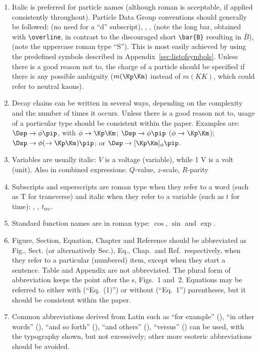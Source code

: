 \begin{enumerate}
\item Italic is preferred for particle names (although roman is
  acceptable, if applied consistently throughout).  Particle Data
  Group conventions should generally be followed: \Bd (no need for a
  ``d'' subscript), \decay{\Bs}{\jpsi\phi}, \Bsb,
  (note the long bar, obtained with \verb!\overline!, in contrast to the discouraged short \verb!\bar{B}! resulting in $\bar{B}$), \KS (note the
  uppercase roman type ``S''). 
This is most easily achieved by using the predefined symbols described in 
  Appendix~\ref{sec:listofsymbols}.
  Unless there is a good reason not to, the charge of a particle should be
  specified if there is any possible ambiguity 
  ($m(\Kp\Km)$ instead of $m(KK)$, which could refer to neutral kaons).

\item Decay chains can be written in several ways, depending on the complexity and the number of times it occurs. Unless there is a good reason not to, usage of a particular type should be consistent within the paper.
Examples are: 
$\Dsp\to\phi\pip$, with $\phi\to\Kp\Km$; 
$\Dsp\to\phi\pip$ ($\phi\to\Kp\Km$);  
$\Dsp\to\phi(\to\Kp\Km)\pip$; or
$\Dsp\to[\Kp\Km]_\phi\pip$.



\item Variables are usually italic: $V$ is a voltage (variable), while
  1 V is a volt (unit). Also in combined expressions: $Q$-value, $z$-scale, $R$-parity \etc

\item Subscripts and superscripts are roman type when they refer to a word (such as T
  for transverse) and italic when they refer to a variable (such as
  $t$ for time): \pt, \dms, $t_{\mathrm{rec}}$.

\item Standard function names are in roman type: \eg $\cos$, $\sin$
  and $\exp$.

\item Figure, Section, Equation, Chapter and Reference should be
  abbreviated as Fig., Sect. (or alternatively Sec.), Eq., Chap.\ and
  Ref.\ respectively, when they refer to a particular (numbered) item,
  except when they start a sentence. Table and Appendix are not
  abbreviated.  The plural form of abbreviation keeps the point after
  the s, \eg Figs.~1 and~2. Equations may be referred to either with 
  (``Eq.~(1)'') or without (``Eq.~1'') parentheses, 
  but it should be consistent within the paper.

\item Common abbreviations derived from Latin such as ``for example''
  (\eg), ``in other words'' (\ie), ``and so forth'' (\etc), ``and
  others'' (\etal), ``versus'' (\vs) can be used, with the typography
  shown, but not excessively; other more esoteric abbreviations should be avoided.
  


\end{enumerate}
